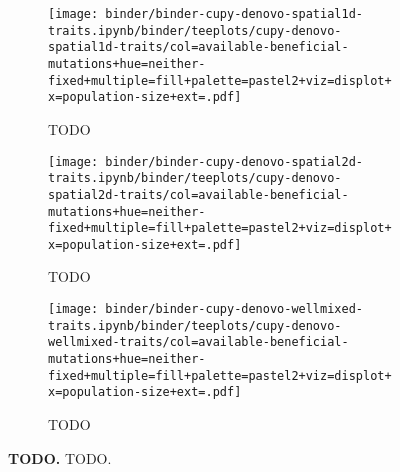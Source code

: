 \begin{sidewaysfigure}[h]
    \begin{subfigure}[b]{0.32\linewidth}
        \begin{minipage}{\linewidth}
          \texttt{[image: binder/binder-cupy-denovo-spatial1d-traits.ipynb/binder/teeplots/cupy-denovo-spatial1d-traits/col=available-beneficial-mutations+hue=neither-fixed+multiple=fill+palette=pastel2+viz=displot+x=population-size+ext=.pdf]}%
        \end{minipage}
        \begin{minipage}{\linewidth}
        \caption{TODO}
        \label{fig:neither-fixed-denovo-cupy:spatial1d}
        \end{minipage}%
    \end{subfigure}%
    \begin{subfigure}[b]{0.32\linewidth}
        \begin{minipage}{\linewidth}
          \texttt{[image: binder/binder-cupy-denovo-spatial2d-traits.ipynb/binder/teeplots/cupy-denovo-spatial2d-traits/col=available-beneficial-mutations+hue=neither-fixed+multiple=fill+palette=pastel2+viz=displot+x=population-size+ext=.pdf]}%
        \end{minipage}
        \begin{minipage}{\linewidth}
        \caption{TODO}
        \label{fig:neither-fixed-denovo-cupy:spatial2d}
        \end{minipage}%
    \end{subfigure}%
\begin{subfigure}[b]{0.36\linewidth}
    \begin{minipage}{\linewidth}
      \texttt{[image: binder/binder-cupy-denovo-wellmixed-traits.ipynb/binder/teeplots/cupy-denovo-wellmixed-traits/col=available-beneficial-mutations+hue=neither-fixed+multiple=fill+palette=pastel2+viz=displot+x=population-size+ext=.pdf]}%
    \end{minipage}
    \begin{minipage}{\linewidth}
    \caption{TODO}
    \label{fig:neither-fixed-denovo-cupy:wellmixed}
    \end{minipage}%
\end{subfigure}%


  \begin{minipage}{\linewidth}
    \caption{%
      \textbf{TODO.}
      \footnotesize
     TODO.
    }
    \label{fig:neither-fixed-denovo-cupy}
  \end{minipage}
\end{sidewaysfigure}
